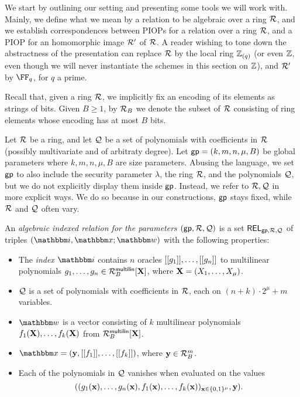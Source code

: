 \documentclass[11pt,letterpaper,usenames,dvipsnames]{article}
\begin{document}
    We start by outlining our setting and presenting some tools we will work with. Mainly, we define what we mean by a relation to be algebraic over a ring $\mathcal{R}$, and we establish correspondences between PIOPs for a relation over a ring $\mathcal{R}$, and a PIOP for an homomorphic image $\mathcal{R}'$ of $\mathcal{R}$. A reader wishing to tone down the abstractness of the presentation can replace $\mathcal{R}$ by the local ring $\mathbb{Z}_{(q)}$ (or even $\mathbb{Z}$, even though we will never instantiate the schemes in this section on $\mathbb{Z}$), and $\mathcal{R}'$ by $\FF_q$, for $q$ a prime.

    
    Recall that, given a ring $\mathcal{R}$, we implicitly fix an encoding of its elements as strings of bits. Given $B\geq 1$, by $\mathcal{R}_B$ we denote the subset of $\mathcal{R}$ consisting of ring elements whose encoding has at most $B$ bits.

    \begin{definition}
    \label{d: Algebraic  Indexed Relation over a ring}
    Let $\mathcal{R}$ be a ring, and let $\mathcal{Q}$ be a set of polynomials with coefficients in $\mathcal{R}$ (possibly multivariate and of arbitraty degree). Let $\mathsf{gp}=(k,m,n,\mu, B)$ be  global parameters where $k,m,n,\mu,B$ are size parameters.  Abusing the language, we set $\mathsf{gp}$ to also include the security parameter $\lambda$, the ring $\mathcal{R}$, and the polynomials $\mathcal{Q}$, but we do not explicitly display them inside $\mathsf{gp}$. Instead, we refer to $\mathcal{R}, \mathcal{Q}$ in more explicit ways. We do so because in our constructions, $\mathsf{gp}$ stays fixed, while $\mathcal{R}$ and $\mathcal{Q}$ often vary.
    
    An \emph{algebraic indexed relation for the parameters $(\mathsf{gp}, \mathcal{R}, \mathcal{Q})$}  is a set $\mathsf{REL}_{\mathsf{gp},\mathcal{R},\mathcal{Q}}$ of triples $(\idx, \inp; \wit)$ with the following properties:
    
        \begin{itemize}
            \item The \emph{index} $\idx$ contains  $n$ oracles $[[{g_1}]],\ldots, [[{g_n}]]$ to multilinear polynomials $g_1,\ldots, g_n\in \mathcal{R}_B^{\mathsf{multilin}}[\mathbf{X}]$, where $\mathbf{X}=(X_1,\ldots, X_\mu)$.
            \item $\mathcal{Q}$ is a set of polynomials with coefficients in $\mathcal{R}$, each on $(n+ k)\cdot 2^\mu + m$ variables.
            \item $\wit$ is a vector consisting of $k$ multilinear polynomials $f_1(\mathbf{X}),\ldots, f_k(\mathbf{X})$ from $\mathcal{R}_B^{\mathsf{multilin}}[\mathbf{X}]$. %
            \item $\inp=(\yy, \oracle{f_1}, \ldots, \oracle{f_k})$, where $\mathbf{y}\in \mathcal{R}_B^m$.
            \item Each of the polynomials in $\mathcal{Q}$ vanishes when evaluated on the values $$((g_1(\mathbf{x}),\ldots, g_n(\mathbf{x}), f_1(\mathbf{x}),\ldots, f_k(\mathbf{x}))_{\mathbf{x}\in \{0,1\}^\mu}, \mathbf{y}).$$ 
        \end{itemize}
    

\end{definition}
\end{document}

